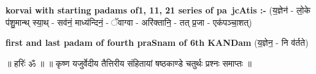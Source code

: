 \documentclass[17pt]{extarticle}
\begin{document}
\textbf{korvai with starting padams of1, 11, 21 series of pa~jcAtis :-} \newline
(य॒ज्ञेन॑ - लो॒के प॑शु॒मान्थ् स्या॒थ् - सव॑नं॒ माध्य॑न्दिनं॒ - ॅवाग्वा - अरि॑क्तानि॒ - तत् प्र॒जा - एक॑पञ्चा॒शत्) \newline

\textbf{first and last padam of fourth praSnam of 6th KANDam} \newline
(य॒ज्ञेन॒ - नि व॑र्तते) \newline 


॥ हरिः॑ ॐ ॥
॥ कृष्ण यजुर्वेदीय तैत्तिरीय संहितायां षष्ठकाण्डे चतुर्थः प्रश्नः समाप्तः ॥ \newline
\pagebreak
\pagebreak
        
\end{document}
